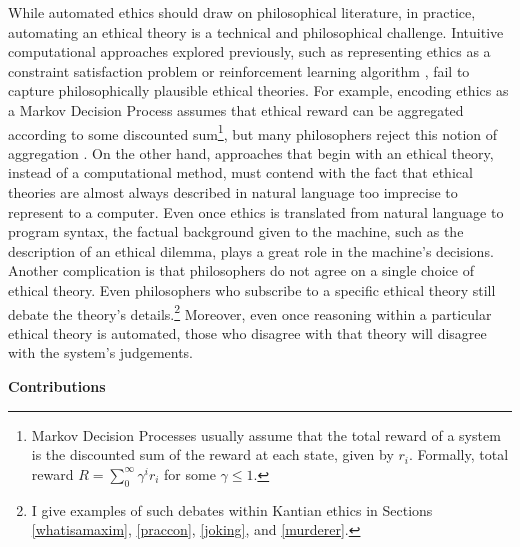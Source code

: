 \begin{isabellebody}
\begin{isamarkuptext}
While automated ethics should draw on philosophical literature, in practice, automating an ethical 
theory is a technical and philosophical challenge. Intuitive computational approaches explored 
previously, such as representing ethics as a constraint satisfaction problem \citep{csp} or reinforcement 
learning algorithm \citep{util1}, fail to capture philosophically plausible ethical theories. For 
example, encoding ethics as a Markov Decision Process assumes that ethical reward can be aggregated 
according to some discounted sum\footnote{Markov Decision Processes usually assume that the total
reward of a system is the discounted sum of the reward at each state, given by $r_i$. Formally, total
reward $R=\sum_0^{\infty}\gamma^ir_i$ for some $\gamma \leq 1$.}, but many philosophers reject 
this notion of aggregation \citep{consequentialismsep}. 
On the other hand, approaches that begin with an ethical theory, instead of a computational method, must contend with the 
fact that ethical theories are almost always described in natural language too
imprecise to represent to a computer. Even once ethics is translated from natural 
language to program syntax, the factual background given to the machine, such as the description of 
an ethical dilemma, plays a great role in the machine's decisions. Another complication
is that philosophers do not agree on a single choice of ethical theory. Even philosophers who
subscribe to a specific ethical theory still debate the theory's 
details.\footnote{I give examples of such debates within Kantian ethics in Sections \ref{whatisamaxim}, 
\ref{praccon}, \ref{joking}, and \ref{murderer}.} Moreover, even once reasoning within a 
particular ethical theory is automated, those who disagree with that theory will disagree with the 
system's judgements.

\noindent \textbf{Contributions}

\medskip 


\end{isamarkuptext}
\end{isabellebody}
